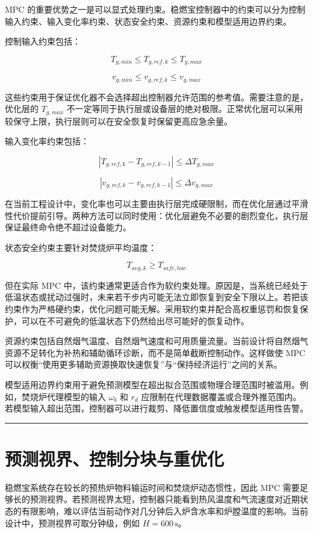 \documentclass[UTF8,openany,zihao=-4,oneside]{ctexbook}
\newcommand{\manualdivider}{\par\vspace{0.6em}\noindent\textcolor{FGLine}{\rule{\linewidth}{0.7pt}}\vspace{0.6em}\par}
\begin{document}
MPC 的重要优势之一是可以显式处理约束。稳燃宝控制器中的约束可以分为控制输入约束、输入变化率约束、状态安全约束、资源约束和模型适用边界约束。

控制输入约束包括：

\[
T_{g,min}\leq T_{g,ref,k}\leq T_{g,max}
\]

\[
v_{g,min}\leq v_{g,ref,k}\leq v_{g,max}
\]

这些约束用于保证优化器不会选择超出控制器允许范围的参考值。需要注意的是，优化层的 \(T_{g,max}\) 不一定等同于执行层或设备层的绝对极限。正常优化层可以采用较保守上限，执行层则可以在安全恢复时保留更高应急余量。

输入变化率约束包括：

\[
\left|T_{g,ref,k}-T_{g,ref,k-1}\right|\leq \Delta T_{g,max}
\]

\[
\left|v_{g,ref,k}-v_{g,ref,k-1}\right|\leq \Delta v_{g,max}
\]

在当前工程设计中，变化率也可以主要由执行层完成硬限制，而在优化层通过平滑性代价提前引导。两种方法可以同时使用：优化层避免不必要的剧烈变化，执行层保证最终命令绝不超过设备能力。

状态安全约束主要针对焚烧炉平均温度：

\[
T_{avg,k}\geq T_{safe,low}
\]

但在实际 MPC 中，该约束通常更适合作为软约束处理。原因是，当系统已经处于低温状态或扰动过强时，未来若干步内可能无法立即恢复到安全下限以上。若把该约束作为严格硬约束，优化问题可能无解。采用软约束并配合高权重惩罚和恢复保护，可以在不可避免的低温状态下仍然给出尽可能好的恢复动作。

资源约束包括自然烟气温度、自然烟气速度和可用质量流量。当前设计将自然烟气资源不足转化为补热和辅助循环诊断，而不是简单截断控制动作。这样做使 MPC 可以权衡“使用更多辅助资源换取快速恢复”与“保持经济运行”之间的关系。

模型适用边界约束用于避免预测模型在超出拟合范围或物理合理范围时被滥用。例如，焚烧炉代理模型的输入 \(\omega_b\) 和 \(r_d\) 应限制在代理数据覆盖或合理外推范围内。若模型输入超出范围，控制器可以进行裁剪、降低置信度或触发模型适用性告警。

\manualdivider

\section{预测视界、控制分块与重优化}\label{sec:horizon-blocking-reopt}

稳燃宝系统存在较长的预热炉物料输运时间和焚烧炉动态惯性，因此 MPC 需要足够长的预测视界。若预测视界太短，控制器只能看到热风温度和气流速度对近期状态的有限影响，难以评估当前动作对几分钟后入炉含水率和炉膛温度的影响。当前设计中，预测视界可取分钟级，例如 \(H=600\,\mathrm{s}\)。
\end{document}
